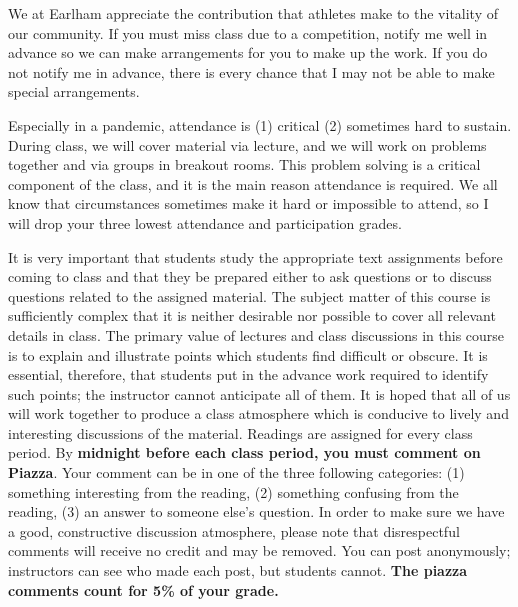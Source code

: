 \documentclass[12pt]{article}
\begin{document}
{\begin{description}
        We at Earlham appreciate the contribution that athletes make
        to the vitality of our community. If you must miss class due
        to a competition, notify me well in advance so we can make
        arrangements for you to make up the work. If you do not notify
        me in advance, there is every chance that I may not be able to
        make special arrangements.

  \item[Attendance/preparation/participation (including Piazza):]
        Especially in a pandemic, attendance is (1) critical (2)
        sometimes hard to sustain. During class, we will cover
        material via lecture, and we will work on problems together and via groups in breakout rooms. This
        problem solving is a critical component of the class, and it is the main reason
        attendance is required. We all know that circumstances
        sometimes make it hard or impossible to attend, so I will drop
        your three lowest attendance and participation grades.

        It is very important that students study the appropriate text
        assignments before coming to class and that they be prepared either to
        ask questions or to discuss questions related to the assigned
        material.  The subject matter of this course is sufficiently complex
        that it is neither desirable nor possible to cover all relevant
        details in class.  The primary value of lectures and class discussions
        in this course is to explain and illustrate points which students find
        difficult or obscure.  It is essential, therefore, that students put
        in the advance work required to identify such points; the instructor
        cannot anticipate all of them.  It is hoped that all of us will work
        together to produce a class atmosphere which is conducive to lively
        and interesting discussions of the material.
        Readings are
        assigned for every class period. By \textbf{midnight before each
        class period, you must comment on Piazza}. Your comment can be
        in one of the three following categories: (1) something
        interesting from the reading, (2) something confusing from the
        reading, (3) an answer to someone else’s question. In order to
        make sure we have a good, constructive discussion atmosphere,
        please note that disrespectful comments will receive no credit
        and may be removed. You can post anonymously; instructors can
        see who made each post, but students cannot.
        \textbf{The piazza comments count for 5\% of your grade.}
        

\end{description}}
\end{document}
